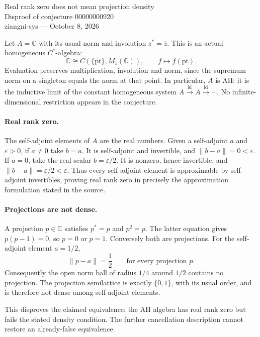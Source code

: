 \documentclass[11pt]{article}
\begin{document}
\begin{center}{\Large Real rank zero does not mean projection density}\\[4pt]
Disproof of conjecture 00000000920\\[4pt]
ziangni-sys --- October 8, 2026\end{center}

Let $A=\mathbb C$ with its usual norm and involution $z^*=\overline z$.
This is an actual homogeneous $C^*$-algebra:
\[
 \mathbb C\cong C(\{\mathrm{pt}\},M_1(\mathbb C)),
 \qquad f\longmapsto f(\mathrm{pt}).
\]
Evaluation preserves multiplication, involution and norm, since the
supremum norm on a singleton equals the norm at that point. In particular,
$A$ is AH: it is the inductive limit of the constant homogeneous system
$A\xrightarrow{\mathrm{id}}A\xrightarrow{\mathrm{id}}\cdots$. No
infinite-dimensional restriction appears in the conjecture.

\paragraph{Real rank zero.}
The self-adjoint elements of $A$ are the real numbers. Given a self-adjoint
$a$ and $\varepsilon>0$, if $a\ne0$ take $b=a$. It is self-adjoint and
invertible, and $\|b-a\|=0<\varepsilon$. If $a=0$, take the real scalar
$b=\varepsilon/2$. It is nonzero, hence invertible, and
$\|b-a\|=\varepsilon/2<\varepsilon$. Thus every self-adjoint element is
approximable by self-adjoint invertibles, proving real rank zero in precisely
the approximation formulation stated in the source.

\paragraph{Projections are not dense.}
A projection $p\in\mathbb C$ satisfies $p^*=p$ and $p^2=p$. The latter
equation gives $p(p-1)=0$, so $p=0$ or $p=1$. Conversely both are
projections. For the self-adjoint element $a=1/2$,
\[
 \|p-a\|=\frac12\qquad\text{for every projection }p.
\]
Consequently the open norm ball of radius $1/4$ around $1/2$ contains no
projection. The projection semilattice is exactly $\{0,1\}$, with its usual
order, and is therefore not dense among self-adjoint elements.

This disproves the claimed equivalence: the AH algebra has real rank zero
but fails the stated density condition. The further cancellation description
cannot restore an already-false equivalence.
\end{document}
